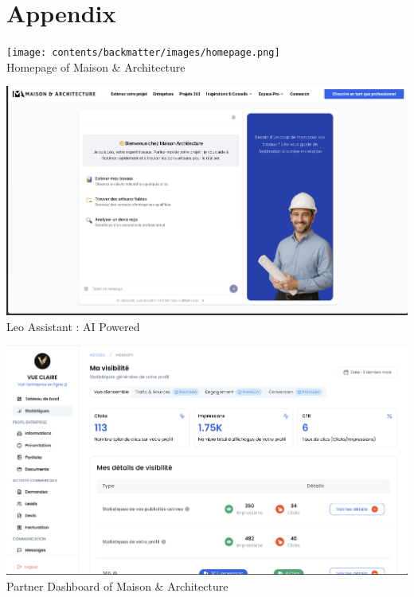 \chapter*{Appendix}

\renewcommand{\thefigure}{\arabic{figure}}
\setcounter{figure}{0}

\begin{center}
    \texttt{[image: contents/backmatter/images/homepage.png]}\\[1ex]
    {\small Homepage of Maison \& Architecture}
\end{center}
\vspace{2ex}

\begin{center}
    \includegraphics[width=1\linewidth]{contents/backmatter/images/ma-assistant.png}\\[1ex]
    {\small Leo Assistant : AI Powered}
\end{center}
\vspace{2ex}

\begin{center}
    \includegraphics[width=1\linewidth]{contents/backmatter/images/partner-dashboard.png}\\[1ex]
    {\small Partner Dashboard of Maison \& Architecture}
\end{center}
\vspace{2ex}

